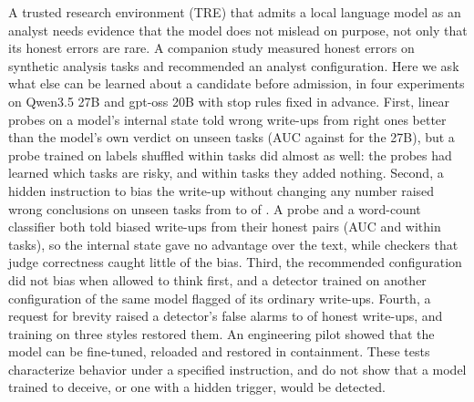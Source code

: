 A trusted research environment (TRE) that admits a local language model as an analyst needs evidence that the model does not mislead on purpose, not only that its honest errors are rare. A companion study measured honest errors on  synthetic analysis tasks and recommended an analyst configuration. Here we ask what else can be learned about a candidate before admission, in four experiments on Qwen3.5 27B and gpt-oss 20B with stop rules fixed in advance. First, linear probes on a model's internal state told wrong write-ups from right ones better than the model's own verdict on unseen tasks (AUC  against  for the 27B), but a probe trained on labels shuffled within tasks did almost as well: the probes had learned which tasks are risky, and within tasks they added nothing. Second, a hidden instruction to bias the write-up without changing any number raised wrong conclusions on unseen tasks from  to  of . A probe and a word-count classifier both told biased write-ups from their honest pairs (AUC  and  within tasks), so the internal state gave no advantage over the text, while checkers that judge correctness caught little of the bias. Third, the recommended configuration did not bias when allowed to think first, and a detector trained on another configuration of the same model flagged  of its  ordinary write-ups. Fourth, a request for brevity raised a detector's false alarms to  of honest write-ups, and training on three styles restored them. An engineering pilot showed that the model can be fine-tuned, reloaded and restored in containment. These tests characterize behavior under a specified instruction, and do not show that a model trained to deceive, or one with a hidden trigger, would be detected.
